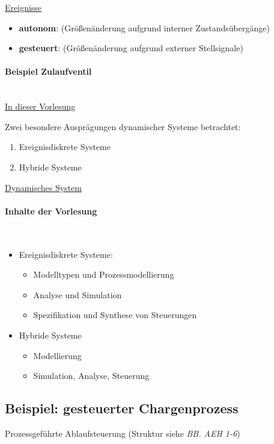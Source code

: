 \documentclass[12pt,a4paper]{scrartcl}
\numberwithin{equation}{section}
\newcommand{\properparagraph}[1]{\paragraph{#1}\mbox{}\\}
\begin{document}
\underline{Ereignisse}
\begin{itemize}
	\item \textbf{autonom}: (Größenänderung aufgrund interner Zustandsübergänge)
	\item \textbf{gesteuert}: (Größenänderung aufgrund externer Stellsignale)
\end{itemize}

\properparagraph{Beispiel Zulaufventil}


\underline{In dieser Vorlesung}

Zwei besondere Ausprägungen dynamischer Systeme betrachtet:
\begin{enumerate}
	\item Ereignisdiskrete Systeme
	\item Hybride Systeme 
\end{enumerate}

\underline{Dynamisches System}

\begin{figure}[H]
	\centering
\end{figure}

\properparagraph{Inhalte der Vorlesung}

\begin{itemize}
	\item Ereignisdiskrete Systeme: 
	\begin{itemize}
		\item Modelltypen und Prozessmodellierung
		\item Analyse und Simulation
		\item Spezifikation und Synthese von Steuerungen
	\end{itemize}
	\item Hybride Systeme
	\begin{itemize}
		\item Modellierung
		\item Simulation, Analyse, Steuerung
	\end{itemize} 
\end{itemize}


\subsection{Beispiel: gesteuerter Chargenprozess}
Prozessgeführte Ablaufsteuerung (Struktur siehe \textit{BB. AEH 1-6})
\end{document}
